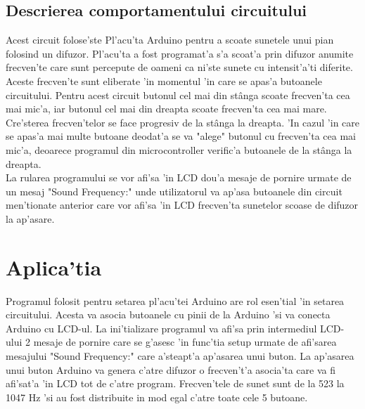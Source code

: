 \subsection{Descrierea comportamentului circuitului}
\myindent
Acest circuit folose'ste Pl'acu'ta Arduino pentru a scoate sunetele unui pian folosind un difuzor. Pl'acu'ta a fost programat'a s'a scoat'a prin difuzor anumite frecven'te care sunt percepute de oameni ca ni'ste sunete cu intensit'a'ti diferite. Aceste frecven'te sunt eliberate 'in momentul 'in care se apas'a butoanele circuitului. Pentru acest circuit butonul cel mai din st\^anga scoate frecven'ta cea mai mic'a, iar butonul cel mai din dreapta scoate frecven'ta cea mai mare. Cre'sterea frecven'telor se face progresiv de la st\^anga la dreapta. 'In cazul 'in care se apas'a mai multe butoane deodat'a se va "alege" butonul cu frecven'ta cea mai mic'a, deoarece programul din microcontroller verific'a butoanele de la st\^anga la dreapta.\\
\myindent
La rularea programului se vor afi'sa 'in LCD dou'a mesaje de pornire urmate de un mesaj "Sound Frequency:" unde utilizatorul va ap'asa butoanele din circuit men'tionate anterior care vor afi'sa 'in LCD frecven'ta sunetelor scoase de difuzor la ap'asare.

\vspace{5mm}
\section{Aplica'tia}
Programul folosit pentru setarea pl'acu'tei Arduino are rol esen'tial 'in setarea circuitului. Acesta va asocia butoanele cu pinii de la Arduino 'si va conecta Arduino cu LCD-ul. La ini'tializare programul va afi'sa prin intermediul LCD-ului 2 mesaje de pornire care se g'asesc 'in func'tia setup urmate de afi'sarea mesajului "Sound Frequency:" care a'steapt'a ap'asarea unui buton. La ap'asarea unui buton Arduino va genera c'atre difuzor o frecven't'a asocia'ta care va fi afi'sat'a 'in LCD tot de c'atre program. Frecven'tele de sunet sunt de la 523 la 1047 Hz 'si au fost distribuite in mod egal c'atre toate cele 5 butoane.\\